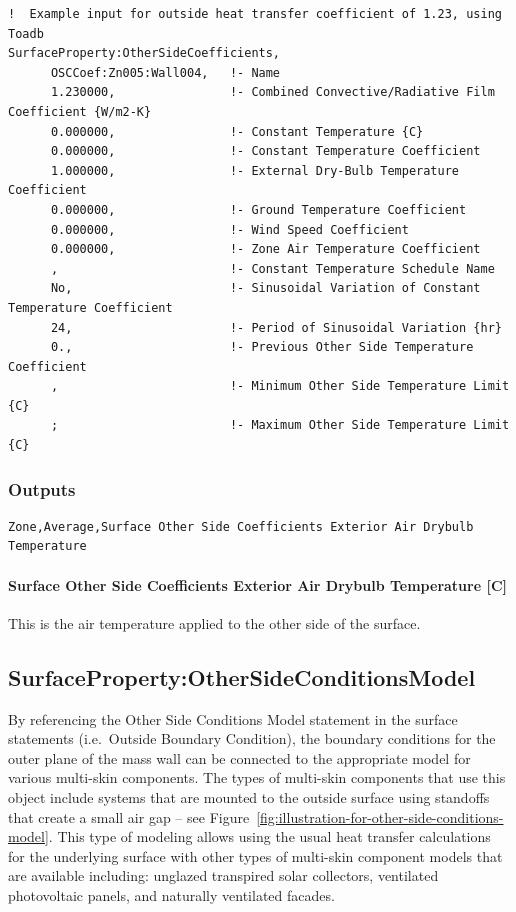\begin{lstlisting}
!  Example input for outside heat transfer coefficient of 1.23, using Toadb
SurfaceProperty:OtherSideCoefficients,
      OSCCoef:Zn005:Wall004,   !- Name
      1.230000,                !- Combined Convective/Radiative Film Coefficient {W/m2-K}
      0.000000,                !- Constant Temperature {C}
      0.000000,                !- Constant Temperature Coefficient
      1.000000,                !- External Dry-Bulb Temperature Coefficient
      0.000000,                !- Ground Temperature Coefficient
      0.000000,                !- Wind Speed Coefficient
      0.000000,                !- Zone Air Temperature Coefficient
      ,                        !- Constant Temperature Schedule Name
      No,                      !- Sinusoidal Variation of Constant Temperature Coefficient
      24,                      !- Period of Sinusoidal Variation {hr}
      0.,                      !- Previous Other Side Temperature Coefficient
      ,                        !- Minimum Other Side Temperature Limit {C}
      ;                        !- Maximum Other Side Temperature Limit {C}
\end{lstlisting}

\subsubsection{Outputs}\label{outputs}

\begin{lstlisting}
Zone,Average,Surface Other Side Coefficients Exterior Air Drybulb Temperature
\end{lstlisting}

\paragraph{Surface Other Side Coefficients Exterior Air Drybulb Temperature {[}C{]}}\label{surface-other-side-coefficients-exterior-air-drybulb-temperature-c}

This is the air temperature applied to the other side of the surface.

\subsection{SurfaceProperty:OtherSideConditionsModel}\label{surfacepropertyothersideconditionsmodel}

By referencing the Other Side Conditions Model statement in the surface statements (i.e.~Outside Boundary Condition), the boundary conditions for the outer plane of the mass wall can be connected to the appropriate model for various multi-skin components. The types of multi-skin components that use this object include systems that are mounted to the outside surface using standoffs that create a small air gap -- see Figure~\ref{fig:illustration-for-other-side-conditions-model}. This type of modeling allows using the usual heat transfer calculations for the underlying surface with other types of multi-skin component models that are available including: unglazed transpired solar collectors, ventilated photovoltaic panels, and naturally ventilated facades.

